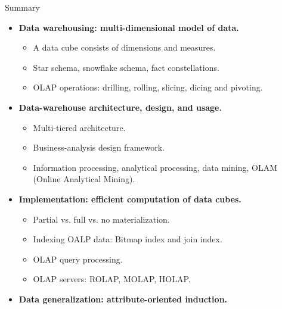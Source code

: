 \documentclass[aspectratio=169,t]{beamer}
\begin{document}
  { 
    \begin{frame}{Summary}
    \begin{itemize}
      \item \textbf{Data warehousing: multi-dimensional model of data.}
      \begin{itemize}
        \item A data cube consists of dimensions and measures.
        \item Star schema, snowflake schema, fact constellations.
        \item OLAP operations: drilling, rolling, slicing, dicing and pivoting.
      \end{itemize}
      \item \textbf{Data-warehouse architecture, design, and usage.}
      \begin{itemize}
        \item Multi-tiered architecture.
        \item Business-analysis design framework.
        \item Information processing, analytical processing, data mining, OLAM (Online Analytical Mining).
      \end{itemize}
      \item \textbf{Implementation: efficient computation of data cubes.}
      \begin{itemize}
        \item Partial vs. full vs. no materialization.
        \item Indexing OALP data: Bitmap index and join index.
        \item OLAP query processing.
        \item OLAP servers: ROLAP, MOLAP, HOLAP.
      \end{itemize}
      \item \textbf{Data generalization: attribute-oriented induction.}
    \end{itemize}
    \end{frame}
  }
\end{document}
